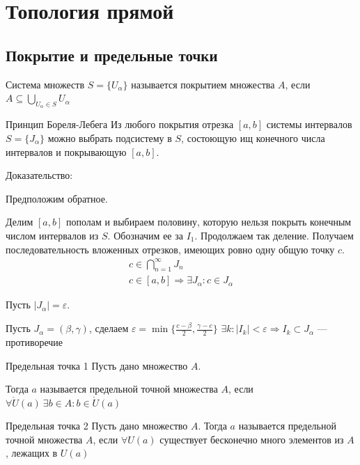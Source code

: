 \section{Топология прямой}

\subsection{Покрытие и предельные точки}

\begin{defn}{}{}
    Система множеств \( S = \{ U_\alpha \} \) называется покрытием множества \( A \),
    если \( A \subseteq \bigcup\limits_{U_\alpha \in S} U_\alpha \)
\end{defn}

\begin{thrm}{Принцип Бореля-Лебега}{}
    Из любого покрытия отрезка \( [a, b] \) системы интервалов \( S = \{ J_\alpha \} \)
    можно выбрать подсистему в \( S \), состоющую ищ конечного числа интервалов и покрывающую \( [a, b] \).
\end{thrm}

Доказательство:

Предположим обратное.

Делим \( [a, b] \) пополам и выбираем половину, которую нельзя покрыть конечным числом интервалов из \( S \).
Обозначим ее за \( I_1 \). Продолжаем так деление.
Получаем последовательность вложенных отрезков, имеющих ровно одну общую точку \( c \).
\begin{gather*}
    c \in \bigcap\limits_{n = 1}^{\infty} J_n
    \\
    c \in [a, b] \Rightarrow \exists J_\alpha : c \in J_\alpha
\end{gather*}

Пусть \( |J_\alpha| = \varepsilon \).

Пусть \( J_\alpha = ( \beta, \gamma ) \), сделаем \( \varepsilon = \min \{ \frac{c - \beta}{2}, \frac{\gamma - c}{2} \} \)
\( \exists k : |I_k| < \varepsilon \Rightarrow I_k \subset J_\alpha \) --- противоречие

\begin{defn}{Предельная точка 1}{}
    Пусть дано множество \( A \).

    Тогда \( a \) называется предельной точной множества \( A \), 
    если \( \forall \mathring{U}(a) \ \exists b \in A : b \in \mathring{U}(a) \)
\end{defn}

\begin{defn}{Предельная точка 2}{}
    Пусть дано множество \( A \).
    Тогда \( a \) называется предельной точной множества \( A \), 
    если \( \forall U(a) \) существует бесконечно много элементов из \( A \), лежащих в \( U(a) \)
\end{defn}

